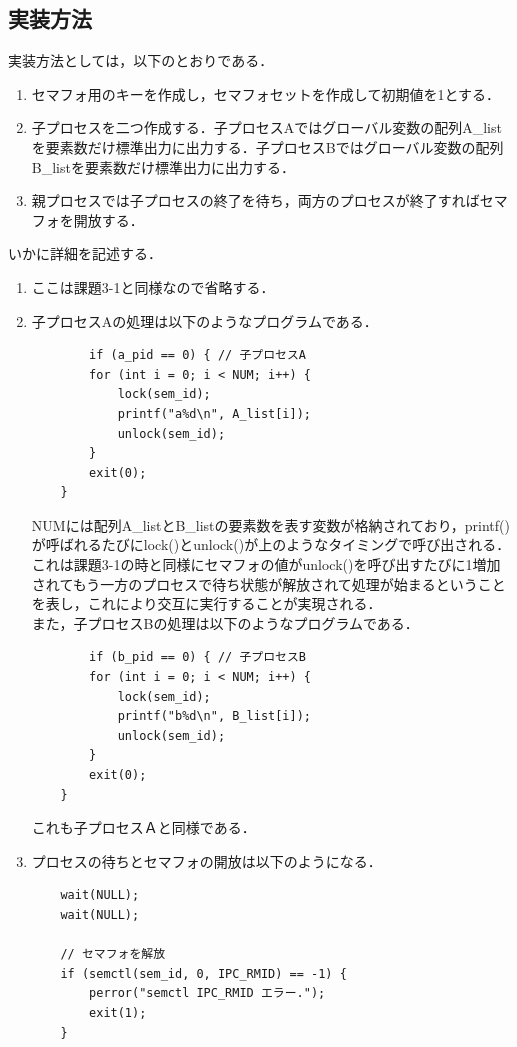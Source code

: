 \documentclass[dvipdfmx]{jarticle}
\begin{document}
\subsection{実装方法}
実装方法としては，以下のとおりである．
\begin{enumerate}
    \item セマフォ用のキーを作成し，セマフォセットを作成して初期値を1とする．
    \item 子プロセスを二つ作成する．子プロセスAではグローバル変数の配列A\_listを要素数だけ標準出力に出力する．子プロセスBではグローバル変数の配列B\_listを要素数だけ標準出力に出力する．
    \item 親プロセスでは子プロセスの終了を待ち，両方のプロセスが終了すればセマフォを開放する．
\end{enumerate}
いかに詳細を記述する．
\begin{enumerate}
    \item ここは課題3-1と同様なので省略する．
    \item 子プロセスAの処理は以下のようなプログラムである．
    \begin{lstlisting}
        if (a_pid == 0) { // 子プロセスA
        for (int i = 0; i < NUM; i++) {
            lock(sem_id);
            printf("a%d\n", A_list[i]);
            unlock(sem_id);
        }
        exit(0);
    }
    \end{lstlisting}
    NUMには配列A\_listとB\_listの要素数を表す変数が格納されており，printf()が呼ばれるたびにlock()とunlock()が上のようなタイミングで呼び出される．
    これは課題3-1の時と同様にセマフォの値がunlock()を呼び出すたびに1増加されてもう一方のプロセスで待ち状態が解放されて処理が始まるということを表し，これにより交互に実行することが実現される．
    \\
    また，子プロセスBの処理は以下のようなプログラムである．
    \begin{lstlisting}
        if (b_pid == 0) { // 子プロセスB
        for (int i = 0; i < NUM; i++) {
            lock(sem_id);
            printf("b%d\n", B_list[i]);
            unlock(sem_id);
        }
        exit(0);
    }
    \end{lstlisting}
    これも子プロセスＡと同様である．
    \item プロセスの待ちとセマフォの開放は以下のようになる．
    \begin{lstlisting}
    wait(NULL);
    wait(NULL);

    // セマフォを解放
    if (semctl(sem_id, 0, IPC_RMID) == -1) {
        perror("semctl IPC_RMID エラー.");
        exit(1);
    }
    \end{lstlisting}
\end{enumerate}
\end{document}
